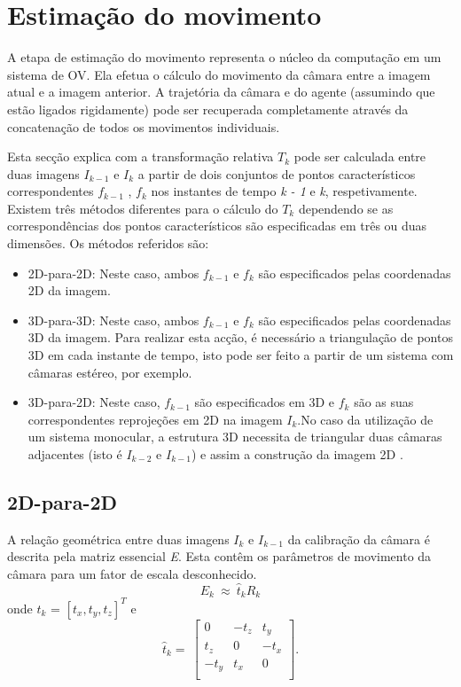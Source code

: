 \section{Estimação do movimento}

A etapa de estimação do movimento representa o núcleo da computação em um sistema de OV. Ela efetua o cálculo do movimento da câmara entre a imagem atual e a imagem anterior. A trajetória da câmara e do agente (assumindo que estão ligados rigidamente) pode ser recuperada completamente através da concatenação de todos os movimentos individuais.

Esta secção explica com a transformação relativa \textit{$T_k$} pode ser calculada entre duas imagens \textit{$I_{k-1}$} e \textit{$I_k$} a partir de dois conjuntos de pontos característicos correspondentes \textit{$f_{k-1}$} , \textit{$f_k$} nos instantes de tempo \textit{k - 1} e \textit{k}, respetivamente. Existem três métodos diferentes para o cálculo do \textit{$T_k$} dependendo se as correspondências dos pontos característicos são especificadas em três ou duas dimensões. Os métodos referidos são:


\begin{itemize}
	\item 2D-para-2D: Neste caso, ambos \textit{$f_{k-1}$} e \textit{$f_k$} são especificados pelas coordenadas 2D da imagem.
	\item 3D-para-3D: Neste caso, ambos \textit{$f_{k-1}$} e \textit{$f_k$} são especificados pelas coordenadas 3D da imagem. Para realizar esta acção, é necessário a triangulação de pontos 3D em cada instante de tempo, isto pode ser feito a partir de um sistema com câmaras estéreo, por exemplo.
	\item 3D-para-2D: Neste caso, \textit{$f_{k-1}$} são especificados em 3D e \textit{$f_k$} são as suas correspondentes reprojeções em 2D na imagem \textit{$I_k$}.No caso da utilização de um sistema monocular, a estrutura 3D necessita de triangular duas câmaras adjacentes (isto é \textit{$I_{k-2}$} e \textit{$I_{k-1}$}) e assim a construção da imagem 2D . 
\end{itemize}



\subsection{2D-para-2D}

A relação geométrica entre duas imagens \textit{$I_k$} e \textit{$I_{k-1}$} da calibração da câmara é descrita pela matriz essencial \textit{E}. Esta contêm os parâmetros de movimento da câmara para um fator de escala desconhecido. \[ E_k\ \approx\ {\hat{t}}_kR_k \] onde \textit{$t_k$} = $[ \textit{$t_x$}, \textit{$t_y$}, \textit{$t_z$} ]^T$ e \[ \hat{t}_k =\ \left[\begin{array}{ccc}0&-t_z&t_y\\t_z&0&-t_x\\-t_y&t_x&0\\\end{array}\right] . \]

